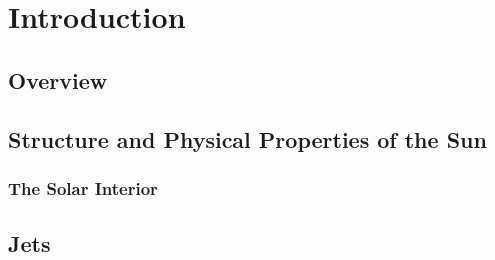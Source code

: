 \documentclass[12pt]{ociamthesis}
\begin{document}
\baselineskip=18pt

\setcounter{secnumdepth}{3}
\setcounter{tocdepth}{3}


\chapter{Introduction}
\label{chap:intro}
\citep{Alissandrakis1971SoPh2047A}
\section{Overview}
\label{sec:overview}

\section{Structure and Physical Properties of the Sun}
\label{sec:structure}

\subsection{The Solar Interior}
\label{subsec:interior}

\section{Jets}
\label{sec:Jets}
\end{document}
